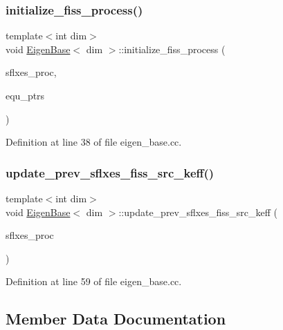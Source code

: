 \subsubsection{\texorpdfstring{initialize\+\_\+fiss\+\_\+process()}{initialize\_fiss\_process()}}
{\footnotesize\ttfamily template$<$int dim$>$ \\
void \hyperlink{class_eigen_base}{Eigen\+Base}$<$ dim $>$\+::initialize\+\_\+fiss\+\_\+process (\begin{DoxyParamCaption}\item[{std\+::vector$<$ Vector$<$ double $>$ $>$ \&}]{sflxes\+\_\+proc,  }\item[{std\+::vector$<$ std\+\_\+cxx11\+::shared\+\_\+ptr$<$ \hyperlink{class_equation_base}{Equation\+Base}$<$ dim $>$ $>$ $>$ \&}]{equ\+\_\+ptrs }\end{DoxyParamCaption})\hspace{0.3cm}{\ttfamily [protected]}}



Definition at line 38 of file eigen\+\_\+base.\+cc.

\mbox{\label{class_eigen_base_aa51c202e12e88c70652aefbe4d399f2b}} 
\subsubsection{\texorpdfstring{update\+\_\+prev\+\_\+sflxes\+\_\+fiss\+\_\+src\+\_\+keff()}{update\_prev\_sflxes\_fiss\_src\_keff()}}
{\footnotesize\ttfamily template$<$int dim$>$ \\
void \hyperlink{class_eigen_base}{Eigen\+Base}$<$ dim $>$\+::update\+\_\+prev\+\_\+sflxes\+\_\+fiss\+\_\+src\+\_\+keff (\begin{DoxyParamCaption}\item[{std\+::vector$<$ Vector$<$ double $>$ $>$ \&}]{sflxes\+\_\+proc }\end{DoxyParamCaption})\hspace{0.3cm}{\ttfamily [virtual]}}



Definition at line 59 of file eigen\+\_\+base.\+cc.



\subsection{Member Data Documentation}
\mbox{\label{class_eigen_base_af082247a6dec17c46fd664a780d9a765}} 

